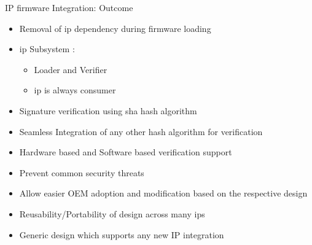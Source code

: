 \begin{frame}{IP firmware Integration: Outcome}
    \begin{itemize}
        \item Removal of \gls{ip} dependency during firmware loading
        \item \gls{ip} Subsystem :
        \begin{itemize}
            \item Loader and Verifier
            \item \gls{ip} is always consumer
        \end{itemize}
        \item Signature verification using \gls{sha} hash algorithm
        \item Seamless Integration of any other hash algorithm for verification
        \item Hardware based and Software based verification support
        \item Prevent common security threats
        \item Allow easier OEM adoption and modification based on the respective design
        \item Reusability/Portability of design across many \gls{ip}s
        \item Generic design which supports any new IP integration
    \end{itemize}
\end{frame}